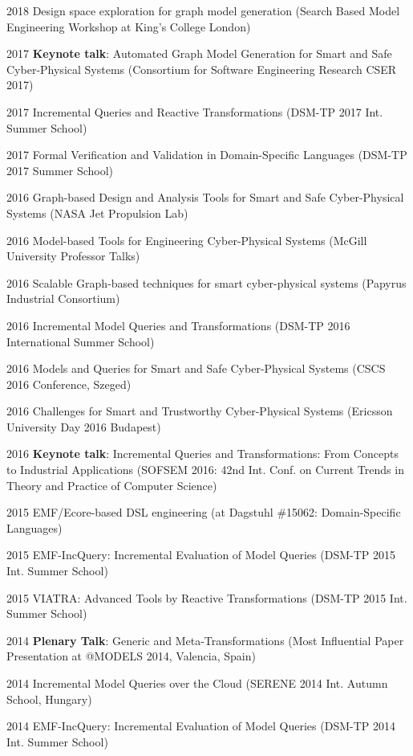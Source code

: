 \begin{yearlist}
\item[2018] Design space exploration for graph model generation  (Search Based Model Engineering Workshop at King's College London) 
\item[2017] \textbf{Keynote talk}: Automated Graph Model Generation for Smart and Safe Cyber-Physical Systems (Consortium for Software Engineering Research CSER 2017)
\item[2017] Incremental Queries and Reactive Transformations (DSM-TP 2017 Int. Summer School)
\item[2017] Formal Verification and Validation in Domain-Specific Languages (DSM-TP 2017 Summer School)
\item[2016] Graph-based  Design and Analysis Tools for Smart and Safe Cyber-Physical Systems (NASA Jet Propulsion Lab) 
\item[2016] Model-based Tools for Engineering Cyber-Physical Systems (McGill University Professor Talks)
\item[2016] Scalable  Graph-based techniques for smart cyber-physical systems (Papyrus Industrial Consortium)
\item[2016] Incremental Model Queries and Transformations (DSM-TP 2016 International Summer School) 
\item[2016] Models and Queries for Smart and Safe Cyber-Physical Systems (CSCS 2016 Conference, Szeged)
\item[2016] Challenges for Smart and Trustworthy Cyber-Physical Systems (Ericsson University Day 2016 Budapest)
\item[2016] \textbf{Keynote talk}: Incremental Queries and Transformations: From Concepts to Industrial Applications  (SOFSEM 2016: 42nd Int. Conf. on Current Trends in Theory and Practice of Computer Science) 
\item[2015] EMF/Ecore-based DSL engineering (at Dagstuhl \#15062:  Domain-Specific Languages)
\item[2015] EMF-IncQuery: Incremental Evaluation of Model Queries (DSM-TP 2015 Int. Summer School)  
\item[2015] VIATRA: Advanced Tools by Reactive Transformations (DSM-TP 2015 Int. Summer School) 
\item[2014] \textbf{Plenary Talk}: Generic and Meta-Transformations (Most Influential Paper Presentation at @MODELS 2014, Valencia, Spain)
\item[2014] Incremental Model Queries over the Cloud (SERENE 2014 Int. Autumn School, Hungary)
\item[2014] EMF-IncQuery: Incremental Evaluation of Model Queries (DSM-TP 2014 Int. Summer School)

\end{yearlist}
